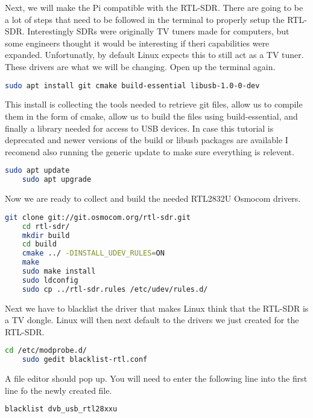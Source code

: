 \documentclass[letterpaper,12pt,notitlepage]{report} %
\begin{document}
Next, we will make the Pi compatible with the RTL-SDR. There are going to be a lot of steps that need to be followed in the terminal to properly setup the RTL-SDR. Interestingly SDRs were originally TV tuners made for computers, but some engineers thought it would be interesting if theri capabilities were expanded. Unfortunatly, by default Linux expects this to still act as a TV tuner. These drivers are what we will be changing. Open up the terminal again.

\begin{lstlisting}[language=bash]
	sudo apt install git cmake build-essential libusb-1.0-0-dev
\end{lstlisting}

This install is collecting the tools needed to retrieve git files, allow us to compile them in the form of cmake, allow us to build the files using build-essential, and finally a library needed for access to USB devices. In case this tutorial is deprecated and newer versions of the build or libusb packages are available I recomend also running the generic update to make sure everything is relevent.

\begin{lstlisting}[language=bash]
	sudo apt update
	sudo apt upgrade
\end{lstlisting}

Now we are ready to collect and build the needed RTL2832U Osmocom drivers.

\begin{lstlisting}[language=bash]
	git clone git://git.osmocom.org/rtl-sdr.git
	cd rtl-sdr/
	mkdir build
	cd build
	cmake ../ -DINSTALL_UDEV_RULES=ON
	make
	sudo make install
	sudo ldconfig
	sudo cp ../rtl-sdr.rules /etc/udev/rules.d/
\end{lstlisting}

Next we have to blacklist the driver that makes Linux think that the RTL-SDR is a TV dongle. Linux will then next default to the drivers we just created for the RTL-SDR.

\begin{lstlisting}[language=bash]
	cd /etc/modprobe.d/
	sudo gedit blacklist-rtl.conf
\end{lstlisting}

A file editor should pop up. You will need to enter the following line into the first line fo the newly created file.

\begin{lstlisting}[language=bash]
	blacklist dvb_usb_rtl28xxu
\end{lstlisting}
\end{document}
